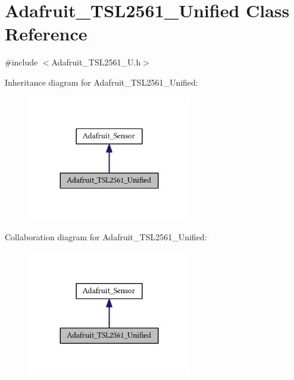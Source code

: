\hypertarget{class_adafruit___t_s_l2561___unified}{}\section{Adafruit\+\_\+\+T\+S\+L2561\+\_\+\+Unified Class Reference}
\label{class_adafruit___t_s_l2561___unified}


{\ttfamily \#include $<$Adafruit\+\_\+\+T\+S\+L2561\+\_\+\+U.\+h$>$}



Inheritance diagram for Adafruit\+\_\+\+T\+S\+L2561\+\_\+\+Unified\+:\nopagebreak
\begin{figure}[H]
\begin{center}
\leavevmode
\includegraphics[width=203pt]{class_adafruit___t_s_l2561___unified__inherit__graph}
\end{center}
\end{figure}


Collaboration diagram for Adafruit\+\_\+\+T\+S\+L2561\+\_\+\+Unified\+:\nopagebreak
\begin{figure}[H]
\begin{center}
\leavevmode
\includegraphics[width=203pt]{class_adafruit___t_s_l2561___unified__coll__graph}
\end{center}
\end{figure}

